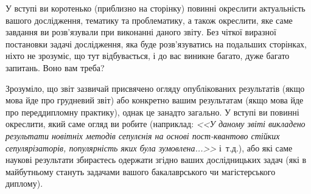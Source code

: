 У вступі ви коротенько (приблизно на сторінку) повинні окреслити 
актуальність вашого дослідження, тематику та проблематику, а також 
окреслити, яке саме завдання ви розв'язували при виконанні даного звіту. 
Без чіткої виразної постановки задачі дослідження, яка буде 
розв'язуватись на подальших сторінках, ніхто не зрозуміє, що тут 
відбувається, і до вас виникне багато, дуже багато запитань. Воно вам 
треба?

Зрозуміло, що звіт зазвичай присвячено огляду опублікованих результатів 
(якщо мова йде про грудневий звіт) або конкретно вашим результатам (якщо 
мова йде про переддипломну практику), однак це занадто загально. У вступі 
ви повинні окреслити, який саме огляд ви робите (наприклад: \emph{<<У даному звіті 
викладено результати новітніх методів сепулєнія на основі пост-квантово 
стійких сепулярізаторів, популярність яких була зумовлена...>>} і~т.д.), 
або які саме наукові результати збираєтесь одержати згідно ваших 
дослідницьких задач (які в майбутньому стануть задачами вашого 
бакалаврського чи магістерського диплому).
